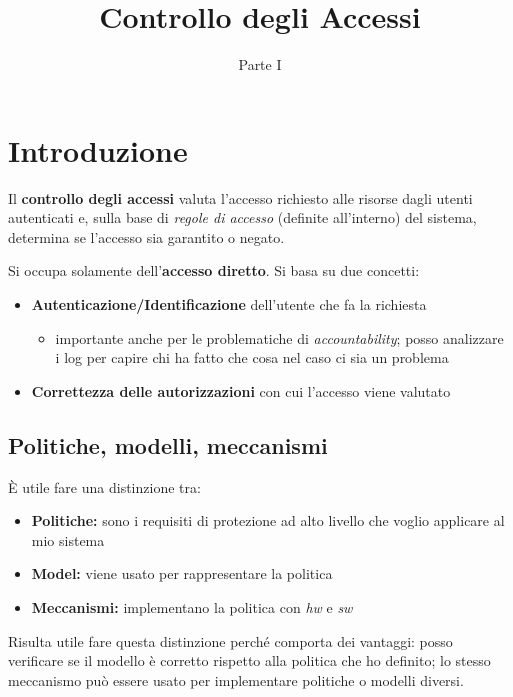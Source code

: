 \documentclass{report}
\title{\huge\textbf{{Controllo degli Accessi}}}
\date{Parte I}
\begin{document}
\maketitle

\tableofcontents
\newpage

\chapter{Introduzione}

\noindent Il \textbf{controllo degli accessi} valuta l'accesso richiesto alle risorse dagli 
utenti autenticati e, sulla base di \textit{regole di accesso} (definite all'interno)
del sistema, determina se l'accesso sia garantito o negato.

Si occupa solamente dell'\textbf{accesso diretto}. Si basa su due concetti:
\begin{itemize}
    \item \textbf{Autenticazione/Identificazione} dell'utente che fa la richiesta
    \begin{itemize}
        \item importante anche per le problematiche di \textit{accountability}; posso
        analizzare i log per capire chi ha fatto che cosa nel caso ci sia un problema
    \end{itemize}
    \item \textbf{Correttezza delle autorizzazioni} con cui l'accesso viene valutato
\end{itemize}

\section{Politiche, modelli, meccanismi}
È utile fare una distinzione tra:
\begin{itemize}
    \item \textbf{Politiche:} sono i requisiti di protezione ad alto livello che voglio applicare 
    al mio sistema 
    \item \textbf{Model:} viene usato per rappresentare la politica 
    \item \textbf{Meccanismi:} implementano la politica con \textit{hw} e \textit{sw}
\end{itemize}

\noindent Risulta utile fare questa distinzione perché comporta dei vantaggi: posso 
verificare se il modello è corretto rispetto alla politica che ho definito; lo 
stesso meccanismo può essere usato per implementare politiche o modelli diversi.
\end{document}
